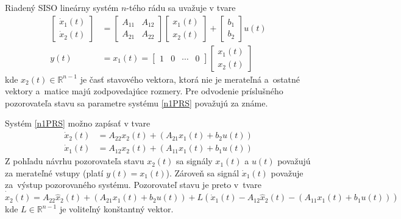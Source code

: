 \documentclass[a4paper, 10pt, ]{article}
\begin{document}
Riadený SISO lineárny systém $n$-tého rádu sa uvažuje v tvare
\begin{subequations} \label{n1PRS}
\begin{align}
	\begin{bmatrix}
		\dot{x}_1(t) \\ \dot{x}_2(t)
	\end{bmatrix}
	& =
	\begin{bmatrix}
		A_{11} & A_{12} \\ 	A_{21} & A_{22}
	\end{bmatrix}
	\begin{bmatrix}
		x_1(t) \\ x_2(t)
	\end{bmatrix}
	+
	\begin{bmatrix}
		b_1 \\ b_2
	\end{bmatrix}
	u(t)
	\\
	y(t)
	& =
	x_1(t)
	 =
	\begin{bmatrix}
		1 & 0 & \cdots & 0
	\end{bmatrix}
	\begin{bmatrix}
		x_1(t) \\ x_2(t)
	\end{bmatrix}
\end{align}
\end{subequations}
kde $x_2(t) \in \mathbb{R}^{n-1}$ je časť stavového vektora, ktorá nie je merateľná a~ostatné vektory a~matice majú zodpovedajúce rozmery. Pre odvodenie príslušného pozorovateľa stavu sa parametre systému \eqref{n1PRS} považujú za známe.





Systém \eqref{n1PRS} možno zapísať v tvare
\begin{subequations}
    \begin{align}
    	\dot{x}_2(t) & = A_{22} x_2(t) + \left( A_{21} x_1(t) + b_2 u(t) \right) \\
    	\dot{x}_1(t) & = A_{12} x_2(t) + \left( A_{11} x_1(t) + b_1 u(t) \right)
    \end{align}
\end{subequations}
Z pohľadu návrhu pozorovateľa stavu $x_2(t)$ sa signály $x_1(t)$ a $u(t)$ považujú za merateľné vstupy (platí $y(t) = x_1(t)$). Zároveň sa signál $\dot{x}_1(t)$ považuje za~výstup pozorovaného systému. Pozorovateľ stavu je preto v~tvare
\begin{equation}
	\dot{\hat{x}}_2(t) = A_{22} \hat{x}_2(t) + \left( A_{21} x_1(t) + b_2 u(t) \right) + L \left( \dot{x}_1(t) - A_{12} \hat{x}_2(t) - \left( A_{11} x_1(t) + b_1 u(t) \right) \right)
\end{equation}
kde $L \in \mathbb{R}^{n-1}$ je voliteľný konštantný vektor.
\end{document}
